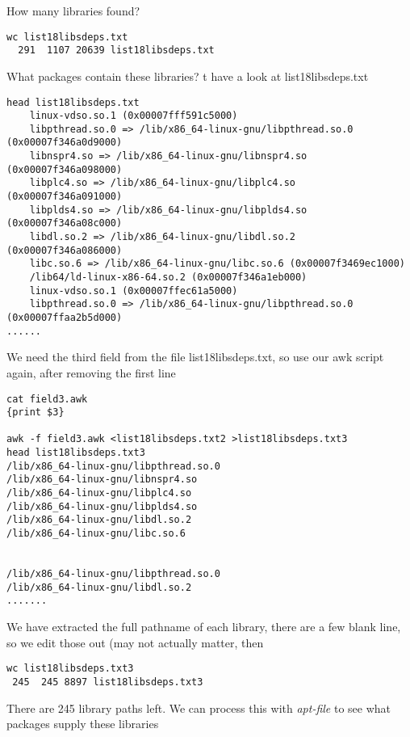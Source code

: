 \documentclass[a4paper]{article}  %
\begin{document}
How many libraries found?
\begin{tcolorbox}
\begin{verbatim} 
wc list18libsdeps.txt
  291  1107 20639 list18libsdeps.txt
\end{verbatim}
\end{tcolorbox}
What packages contain these libraries?
t have a look at list18libsdeps.txt
\begin{tcolorbox}
\begin{verbatim}
head list18libsdeps.txt
	linux-vdso.so.1 (0x00007fff591c5000)
	libpthread.so.0 => /lib/x86_64-linux-gnu/libpthread.so.0 (0x00007f346a0d9000)
	libnspr4.so => /lib/x86_64-linux-gnu/libnspr4.so (0x00007f346a098000)
	libplc4.so => /lib/x86_64-linux-gnu/libplc4.so (0x00007f346a091000)
	libplds4.so => /lib/x86_64-linux-gnu/libplds4.so (0x00007f346a08c000)
	libdl.so.2 => /lib/x86_64-linux-gnu/libdl.so.2 (0x00007f346a086000)
	libc.so.6 => /lib/x86_64-linux-gnu/libc.so.6 (0x00007f3469ec1000)
	/lib64/ld-linux-x86-64.so.2 (0x00007f346a1eb000)
	linux-vdso.so.1 (0x00007ffec61a5000)
	libpthread.so.0 => /lib/x86_64-linux-gnu/libpthread.so.0 (0x00007ffaa2b5d000)
......
\end{verbatim}
\end{tcolorbox}
We need the third field from the file list18libsdeps.txt, so use our awk script again, after removing the first line
\begin{tcolorbox}
\begin{verbatim}
cat field3.awk
{print $3}

awk -f field3.awk <list18libsdeps.txt2 >list18libsdeps.txt3
head list18libsdeps.txt3
/lib/x86_64-linux-gnu/libpthread.so.0
/lib/x86_64-linux-gnu/libnspr4.so
/lib/x86_64-linux-gnu/libplc4.so
/lib/x86_64-linux-gnu/libplds4.so
/lib/x86_64-linux-gnu/libdl.so.2
/lib/x86_64-linux-gnu/libc.so.6


/lib/x86_64-linux-gnu/libpthread.so.0
/lib/x86_64-linux-gnu/libdl.so.2
.......
\end{verbatim}
\end{tcolorbox}
We have extracted the full pathname of each library, there are a few blank line, so we edit those out (may not actually matter, then
\begin{tcolorbox}
\begin{verbatim}
wc list18libsdeps.txt3
 245  245 8897 list18libsdeps.txt3
\end{verbatim}
\end{tcolorbox}
There are 245 library paths left. We can process this with {\em apt-file} to see what packages supply these libraries
\end{document}
